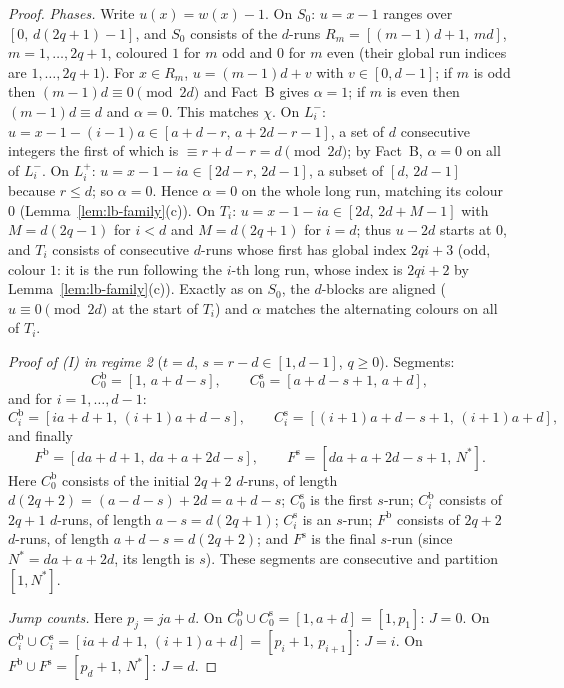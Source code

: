 \begin{proof}
\emph{Phases.} Write $u(x) = w(x) - 1$. On $S_0$: $u = x - 1$ ranges over
$[0,\, d(2q+1) - 1]$, and $S_0$ consists of the $d$-runs
$R_m = [(m-1)d+1,\, md]$, $m = 1, \dots, 2q+1$, coloured $1$ for $m$ odd and $0$
for $m$ even (their global run indices are $1, \dots, 2q+1$). For $x \in R_m$,
$u = (m-1)d + v$ with $v \in [0, d-1]$; if $m$ is odd then
$(m-1)d \equiv 0 \pmod{2d}$ and Fact~B gives $\alpha = 1$; if $m$ is even then
$(m-1)d \equiv d$ and $\alpha = 0$. This matches $\chi$. On $L_i^{-}$:
$u = x - 1 - (i-1)a \in [a+d-r,\, a+2d-r-1]$, a set of $d$ consecutive integers
the first of which is $\equiv r + d - r = d \pmod{2d}$; by Fact~B, $\alpha = 0$ on
all of $L_i^{-}$. On $L_i^{+}$: $u = x - 1 - ia \in [2d-r,\, 2d-1]$, a subset of
$[d,\, 2d-1]$ because $r \le d$; so $\alpha = 0$. Hence $\alpha = 0$ on the whole
long run, matching its colour $0$ (Lemma~\ref{lem:lb-family}(c)). On $T_i$:
$u = x - 1 - ia \in [2d,\, 2d + M - 1]$ with $M = d(2q-1)$ for $i < d$ and
$M = d(2q+1)$ for $i = d$; thus $u - 2d$ starts at $0$, and $T_i$ consists of
consecutive $d$-runs whose first has global index $2qi + 3$ (odd, colour $1$: it is
the run following the $i$-th long run, whose index is $2qi + 2$ by
Lemma~\ref{lem:lb-family}(c)). Exactly as on $S_0$, the $d$-blocks are aligned
($u \equiv 0 \pmod{2d}$ at the start of $T_i$) and $\alpha$ matches the
alternating colours on all of $T_i$.

\emph{Proof of (I) in regime 2} ($t = d$, $s = r - d \in [1, d-1]$, $q \ge 0$).
Segments:
\[
  C_0^{\mathrm{b}} = [1,\, a+d-s], \qquad
  C_0^{\mathrm{s}} = [a+d-s+1,\, a+d],
\]
and for $i = 1, \dots, d-1$:
\[
  C_i^{\mathrm{b}} = [ia+d+1,\, (i+1)a+d-s], \qquad
  C_i^{\mathrm{s}} = [(i+1)a+d-s+1,\, (i+1)a+d],
\]
and finally
\[
  F^{\mathrm{b}} = [da+d+1,\, da+a+2d-s], \qquad
  F^{\mathrm{s}} = [da+a+2d-s+1,\, N^{*}].
\]
Here $C_0^{\mathrm{b}}$ consists of the initial $2q+2$ $d$-runs, of length
$d(2q+2) = (a - d - s) + 2d = a + d - s$; $C_0^{\mathrm{s}}$ is the first $s$-run;
$C_i^{\mathrm{b}}$ consists of $2q+1$ $d$-runs, of length $a - s = d(2q+1)$;
$C_i^{\mathrm{s}}$ is an $s$-run; $F^{\mathrm{b}}$ consists of $2q+2$ $d$-runs, of
length $a + d - s = d(2q+2)$; and $F^{\mathrm{s}}$ is the final $s$-run (since
$N^{*} = da + a + 2d$, its length is $s$). These segments are consecutive and
partition $[1, N^{*}]$.

\emph{Jump counts.} Here $p_j = ja + d$. On
$C_0^{\mathrm{b}} \cup C_0^{\mathrm{s}} = [1, a+d] = [1, p_1]$: $J = 0$. On
$C_i^{\mathrm{b}} \cup C_i^{\mathrm{s}} = [ia+d+1,\, (i+1)a+d] = [p_i+1,\, p_{i+1}]$:
$J = i$. On $F^{\mathrm{b}} \cup F^{\mathrm{s}} = [p_d+1,\, N^{*}]$: $J = d$.


\end{proof}
